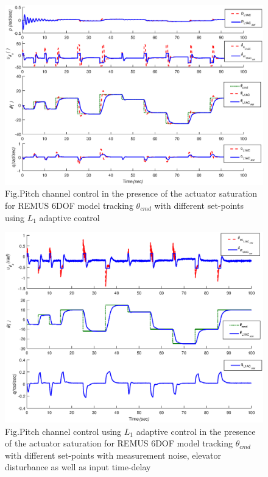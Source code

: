 \begin{figure}[!htp]
 \centering
 \includegraphics[width=16cm]{figure/chap6/F7_track_signal_builder_nonoise.eps}
 \label{fig:chap6:F19}
  {Fig.}{Pitch channel control in the presence of the actuator saturation for REMUS 6DOF model tracking $\theta_{cmd}$ with different set-points using \texorpdfstring {$L_1$}{} adaptive control}
 \end{figure}

 \begin{figure}[!htp]
 \centering
 \includegraphics[width=16cm]{figure/chap6/F8_l1aw_withnoise.eps}
 \label{fig:chap6:F20}
  {Fig.}{Pitch channel control using \texorpdfstring {$L_1$}{} adaptive control in the presence of the actuator saturation for REMUS 6DOF model tracking $\theta_{cmd}$ with different set-points with measurement noise, elevator disturbance as well as input time-delay }
 \end{figure}

